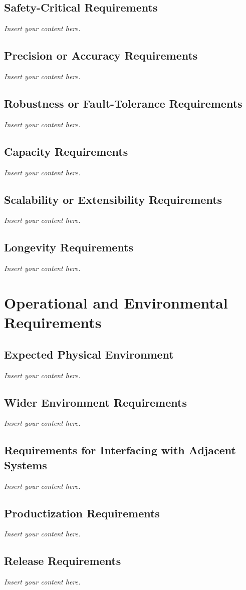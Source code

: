 \documentclass[12pt]{article}
\newcommand{\lips}{\textit{Insert your content here.}}
\begin{document}
\subsection{Safety-Critical Requirements}
\lips
\subsection{Precision or Accuracy Requirements}
\lips
\subsection{Robustness or Fault-Tolerance Requirements}
\lips
\subsection{Capacity Requirements}
\lips
\subsection{Scalability or Extensibility Requirements}
\lips
\subsection{Longevity Requirements}
\lips

\section{Operational and Environmental Requirements}
\subsection{Expected Physical Environment}
\lips
\subsection{Wider Environment Requirements}
\lips
\subsection{Requirements for Interfacing with Adjacent Systems}
\lips
\subsection{Productization Requirements}
\lips
\subsection{Release Requirements}
\lips
\end{document}
